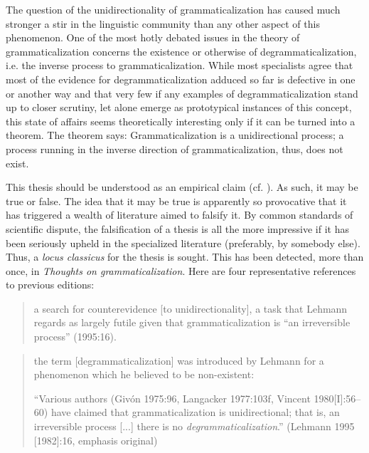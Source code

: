 The question of the unidirectionality of grammaticalization has caused much stronger a stir in the linguistic community than any other aspect of this phenomenon. One of the most hotly debated issues in the theory of grammaticalization concerns the existence or otherwise of degrammaticalization, i.e. the inverse process to grammaticalization. While most specialists agree that most of the evidence for degrammaticalization adduced so far is defective in one or another way and that very few if any examples of degrammaticalization stand up to closer scrutiny, let alone emerge as prototypical instances of this concept, this state of affairs seems theoretically interesting only if it can be turned into a theorem. The theorem says: Grammaticalization is a unidirectional process; a process running in the inverse direction of grammaticalization, thus, does not exist.

This thesis should be understood as an empirical claim (cf. \citealt[§4.2]{Lehmann2004}). As such, it may be true or false. The idea that it may be true is apparently so provocative that it has triggered a wealth of literature aimed to falsify it. By common standards of scientific dispute, the falsification of a thesis is all the more impressive if it has been seriously upheld in the specialized literature (preferably, by somebody else). Thus, a \textit{locus classicus} for the thesis is sought. This has been detected, more than once, in \textit{Thoughts on grammaticalization}. Here are four representative references to previous editions:

\begin{quote}
a search for counterevidence [to unidirectionality], a task that Lehmann regards as largely futile given that grammaticalization is “an irreversible process” (1995:16).

\citep[569]{Howe2010}
\end{quote}

\begin{quote}\enlargethispage{2\baselineskip}
the term [degrammaticalization] was introduced by Lehmann for a phenomenon which he believed to be non-existent:

``Various authors (Givón 1975:96, Langacker 1977:103f, Vincent 1980[I]:56--60) have claimed that grammaticalization is unidirectional; that is, an irreversible process [...] there is no \textit{degrammaticalization}.” (Lehmann 1995 [1982]:16, emphasis original)

\citep[123]{Norde2010}
\end{quote}

